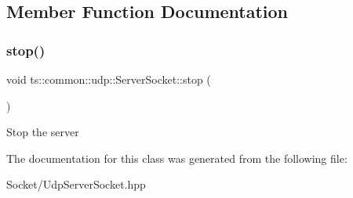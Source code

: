 \subsection{Member Function Documentation}
\mbox{\label{classts_1_1common_1_1udp_1_1_server_socket_a194fa6832f3ac6fa0c4b1c03abc5c8ec}} 
\subsubsection{\texorpdfstring{stop()}{stop()}}
{\footnotesize\ttfamily void ts\+::common\+::udp\+::\+Server\+Socket\+::stop (\begin{DoxyParamCaption}{ }\end{DoxyParamCaption})}

Stop the server 

The documentation for this class was generated from the following file\+:\begin{DoxyCompactItemize}
\item 
Socket/Udp\+Server\+Socket.\+hpp\end{DoxyCompactItemize}

